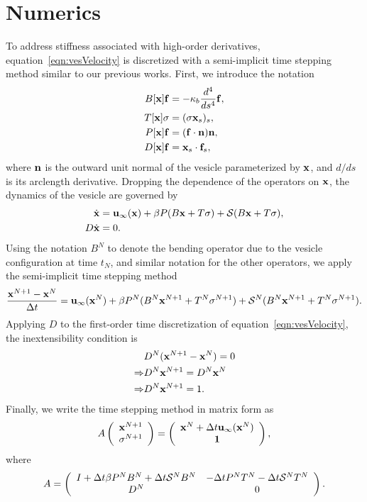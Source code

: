 \documentclass[aps,prl,showpacs]{revtex4}
\begin{document}
\section{Numerics}
To address stiffness associated with high-order derivatives,
equation~\eqref{eqn:vesVelocity} is discretized with a semi-implicit
time stepping method similar to our previous works.  First, we introduce
the notation
\begin{align}
  B[\mathbf{x}]\mathbf{f} &= -\kappa_b\frac{d^4}{ds^4} \mathbf{f}, \\
  T[\mathbf{x}]\sigma &= (\sigma \mathbf{x}_s)_s, \\
  P[\mathbf{x}]\mathbf{f} &= (\mathbf{f} \cdot \mathbf{n}) \mathbf{n}, \\
  D[\mathbf{x}]\mathbf{f} &= \mathbf{x}_s \cdot \mathbf{f}_s,
\end{align}
where $\mathbf{n}$ is the outward unit normal of the vesicle
parameterized by $\mathbf{x}$, and $d/ds$ is its arclength derivative.
Dropping the dependence of the operators on $\mathbf{x}$, the dynamics of the
vesicle are governed by
\begin{align}
  \dot{\mathbf{x}} &= \mathbf{u}_{\infty}(\mathbf{x}) + 
  \beta P(B\mathbf{x} + T\sigma) + \mathcal{S}(B\mathbf{x} + T\sigma), \\
  D \dot{\mathbf{x}} &= 0.
\end{align}
Using the notation $B^N$ to denote the bending operator due to the
vesicle configuration at time $t_N$, and similar notation for the other
operators, we apply the semi-implicit time stepping method
\begin{align}  
  \frac{\mathbf{x}^{N+1} - \mathbf{x}^N}{\Delta t} = \mathbf{u}_\infty(\mathbf{x}^N) 
  + \beta P^N(B^N\mathbf{x}^{N+1} + T^N\sigma^{N+1}) 
  + \mathcal{S}^N(B^N\mathbf{x}^{N+1} + T^N\sigma^{N+1}).
\end{align}
Applying $D$ to the first-order time discretization of
equation~\eqref{eqn:vesVelocity}, the inextensibility condition is
\begin{align*}
  &D^N(\mathbf{x}^{N+1} - \mathbf{x}^N) = 0 \\ 
  \Rightarrow &D^N\mathbf{x}^{N+1} = D^N \mathbf{x}^N \\ 
  \Rightarrow &D^N\mathbf{x}^{N+1} = 1.
\end{align*}
Finally, we write the time stepping method in matrix form as
\begin{align}
  A \left(
    \begin{array}{c}
      \mathbf{x}^{N+1} \\ \sigma^{N+1}
    \end{array}
  \right) = 
  \left(
    \begin{array}{c}
      \mathbf{x}^{N} + \Delta t \mathbf{u}_\infty(\mathbf{x}^N) \\ \mathbf{1}
    \end{array}
  \right),
\end{align}
where
\begin{align}
 A = \left(
  \begin{array}{cc}
    I + \Delta t \beta P^N B^N + \Delta t \mathcal{S}^N B^N & 
    -\Delta t P^N T^N - \Delta t \mathcal{S}^N T^N \\
    D^N & 0
  \end{array}
  \right).
\end{align}
\end{document}
